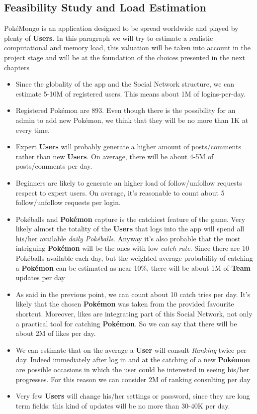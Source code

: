 \subsection{Feasibility Study and Load Estimation}
PokéMongo is an application designed to be spread worldwide and played by plenty of \textbf{Users}. In this paragraph we will try to estimate a realistic computational and memory load, this valuation will be taken into account in the project stage and will be at the foundation of the choices presented in the next chapters

\begin{itemize}
	\item Since the globality of the app and the Social Network structure, we can estimate 5-10M of registered users. This means about 1M of logins-per-day.
	\item Registered Pokémon are 893. Even though there is the possibility for an admin to add new Pokémon, we think that they will be no more than 1K at every time.
	\item Expert \textbf{Users} will probably generate a higher amount of posts/comments rather than new \textbf{Users}. On average, there will be about 4-5M of posts/comments per day.
	\item Beginners are likely to generate an higher load of follow/unfollow requests respect to expert users. On average, it’s reasonable to count about 5 follow/unfollow requests per login.
	\item Pokéballs and \textbf{Pokémon} capture is the catchiest feature of the game. Very likely almost the totality of the \textbf{Users} that logs into the app will spend all his/her available \textit{daily Pokéballs}. Anyway it’s also probable that the most intriguing \textbf{Pokémon} will be the ones with low \textit{catch rate}. Since there are 10 Pokéballs available each day, but the weighted average probability of catching a \textbf{Pokémon} can be estimated as near 10\%, there will be about 1M of \textbf{Team} updates per day
	\item As said in the previous point, we can count about 10 catch tries per day. It’s likely that the chosen \textbf{Pokémon} was taken from the provided favourite shortcut. Moreover, likes are integrating part of this Social Network, not only a practical tool for catching \textbf{Pokémon}. So we can say that there will be about 2M of likes per day.
	\item We can estimate that on the average a \textbf{User} will consult \textit{Ranking} twice per day. Indeed immediately after log in and at the catching of a new \textbf{Pokémon} are possible occasions in which the user could be interested in seeing his/her progresses. For this reason we can consider 2M of ranking consulting per day
	\item Very few \textbf{Users} will change his/her settings or password, since they are long term fields: this kind of updates will be no more than 30-40K per day.
\end{itemize}

